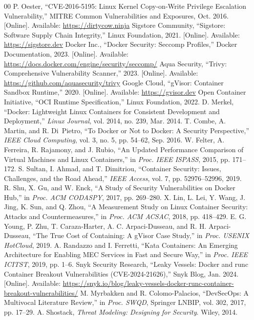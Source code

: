 \documentclass[conference]{IEEEtran}
\begin{document}
\begin{thebibliography}{00}
 P. Oester, ``CVE-2016-5195: Linux Kernel Copy-on-Write Privilege Escalation Vulnerability,'' MITRE Common Vulnerabilities and Exposures, Oct. 2016. [Online]. Available: \url{https://dirtycow.ninja}
 Sigstore Community, ``Sigstore: Software Supply Chain Integrity,'' Linux Foundation, 2021. [Online]. Available: \url{https://sigstore.dev}
 Docker Inc., ``Docker Security: Seccomp Profiles,'' Docker Documentation, 2023. [Online]. Available: \url{https://docs.docker.com/engine/security/seccomp/}
 Aqua Security, ``Trivy: Comprehensive Vulnerability Scanner,'' 2023. [Online]. Available: \url{https://github.com/aquasecurity/trivy}
 Google Cloud, ``gVisor: Container Sandbox Runtime,'' 2020. [Online]. Available: \url{https://gvisor.dev}
 Open Container Initiative, ``OCI Runtime Specification,'' Linux Foundation, 2022.
 D. Merkel, ``Docker: Lightweight Linux Containers for Consistent Development and Deployment,'' \textit{Linux Journal}, vol. 2014, no. 239, Mar. 2014.
 T. Combe, A. Martin, and R. Di~Pietro, ``To Docker or Not to Docker: A Security Perspective,'' \textit{IEEE Cloud Computing}, vol. 3, no. 5, pp. 54--62, Sep. 2016.
 W. Felter, A. Ferreira, R. Rajamony, and J. Rubio, ``An Updated Performance Comparison of Virtual Machines and Linux Containers,'' in \textit{Proc. IEEE ISPASS}, 2015, pp. 171--172.
 S. Sultan, I. Ahmad, and T. Dimitriou, ``Container Security: Issues, Challenges, and the Road Ahead,'' \textit{IEEE Access}, vol. 7, pp. 52976--52996, 2019.
 R. Shu, X. Gu, and W. Enck, ``A Study of Security Vulnerabilities on Docker Hub,'' in \textit{Proc. ACM CODASPY}, 2017, pp. 269--280.
 X. Lin, L. Lei, Y. Wang, J. Jing, K. Sun, and Q. Zhou, ``A Measurement Study on Linux Container Security: Attacks and Countermeasures,'' in \textit{Proc. ACM ACSAC}, 2018, pp. 418--429.
 E. G. Young, P. Zhu, T. Caraza-Harter, A. C. Arpaci-Dusseau, and R. H. Arpaci-Dusseau, ``The True Cost of Containing: A gVisor Case Study,'' in \textit{Proc. USENIX HotCloud}, 2019.
 A. Randazzo and I. Ferretti, ``Kata Containers: An Emerging Architecture for Enabling MEC Services in Fast and Secure Way,'' in \textit{Proc. IEEE ICITST}, 2019, pp. 1--6.
 Snyk Security Research, ``Leaky Vessels: Docker and runc Container Breakout Vulnerabilities (CVE-2024-21626),'' Snyk Blog, Jan. 2024. [Online]. Available: \url{https://snyk.io/blog/leaky-vessels-docker-runc-container-breakout-vulnerabilities/}
 M. Myrbakken and R. Colomo-Palacios, ``DevSecOps: A Multivocal Literature Review,'' in \textit{Proc. SWQD}, Springer LNBIP, vol. 302, 2017, pp. 17--29.
 A. Shostack, \textit{Threat Modeling: Designing for Security}. Wiley, 2014.
\end{thebibliography}
\end{document}
